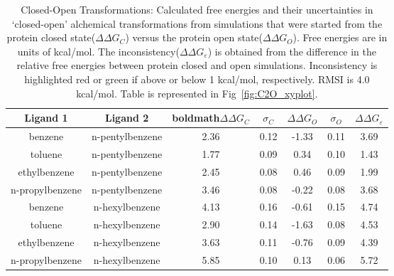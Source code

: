 \begin{table}[!htb]
\centering
\caption{Closed-Open Transformations:
Calculated free energies and their uncertainties in `closed-open' alchemical transformations from simulations that were started from the protein closed state(\boldmath$\Delta\Delta G_{C}$) versus the protein open state(\boldmath$\Delta\Delta G_{O}$). 
 Free energies are in units of kcal/mol. 
 The inconsistency(\boldmath$\Delta\Delta G_{\varepsilon}$) is obtained from the difference in the relative free energies between protein closed and open simulations. 
 Inconsistency is highlighted red or green if above or below 1 kcal/mol, respectively.
 RMSI is 4.0 kcal/mol.
 Table is represented in Fig~\ref{fig:C2O_xyplot}.
}
\label{tbl:C-O}
\begin{tabular}{|c|c|c|c|c|c|c|}
\hline
\textbf{Ligand 1}       & \textbf{Ligand 2}    & boldmath$\Delta\Delta G_{C}$ & \boldmath$\sigma_{C}$ & \boldmath$\Delta\Delta G_{O}$ & \boldmath$\sigma_{O}$ & \boldmath$\Delta\Delta G_{\varepsilon}$ \\ \hline
benzene         & n-pentylbenzene & 2.36                                   & 0.12                       & -1.33                                & 0.11                      & \cellcolor[HTML]{FFCCC9}3.69 \\ \hline
toluene         & n-pentylbenzene & 1.77                                   & 0.09                       & 0.34                                 & 0.10                       & \cellcolor[HTML]{FFCCC9}1.43 \\ \hline
ethylbenzene    & n-pentylbenzene & 2.45                                   & 0.08                       & 0.46                                 & 0.09                       & \cellcolor[HTML]{FFCCC9}1.99 \\ \hline
n-propylbenzene & n-pentylbenzene & 3.46                                   & 0.08                       & -0.22                                & 0.08                      & \cellcolor[HTML]{FFCCC9}3.68 \\ \hline
benzene         & n-hexylbenzene  & 4.13                                   & 0.16                       & -0.61                                & 0.15                       & \cellcolor[HTML]{FFCCC9}4.74 \\ \hline
toluene         & n-hexylbenzene  & 2.90                                   & 0.14                       & -1.63                                & 0.08                       & \cellcolor[HTML]{FFCCC9}4.53 \\ \hline
ethylbenzene    & n-hexylbenzene  & 3.63                                   & 0.11                       & -0.76                                & 0.09                       & \cellcolor[HTML]{FFCCC9}4.39 \\ \hline
n-propylbenzene & n-hexylbenzene  & 5.85                                   & 0.10                       & 0.13                                 & 0.06                       & \cellcolor[HTML]{FFCCC9}5.72 \\ \hline
\end{tabular}
\end{table}

